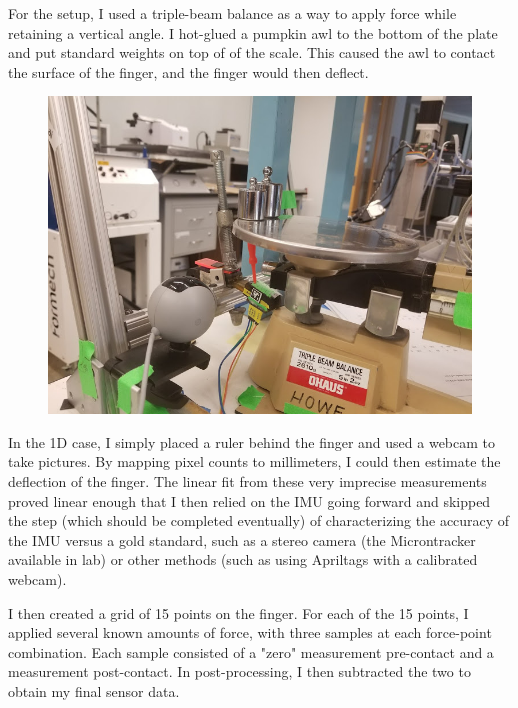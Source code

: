\documentclass[12pt]{article}
\begin{document}
For the setup, I used a triple-beam balance as a way to apply force while retaining a vertical
angle. I hot-glued a pumpkin awl to the bottom of the plate and put standard weights on top of of
the scale. This caused the awl to contact the surface of the finger, and the finger would then
deflect. 

\begin{figure}[H]
\centering
\includegraphics[width=.3\textheight]{images/setup/webcam.jpg}
\end{figure}

In the 1D case, I simply placed a ruler behind the finger and used a webcam to take
pictures. By mapping pixel counts to millimeters, I could then estimate the deflection of the
finger. The linear fit from these very imprecise measurements proved linear enough that I then
relied on the IMU going forward and skipped the step (which should be completed eventually) of
characterizing the accuracy of the IMU versus a gold standard, such as a stereo camera (the
Microntracker available in lab) or other methods (such as using Apriltags with a calibrated webcam). 

I then created a grid of 15 points on the finger. For each of the 15 points, I applied several known
amounts of force, with three samples at each force-point combination. Each sample consisted of a
"zero" measurement pre-contact and a measurement post-contact. In post-processing, I then subtracted
the two to obtain my final sensor data.
\end{document}
